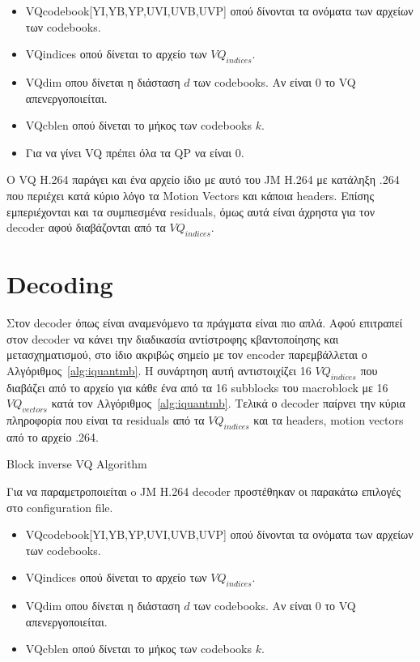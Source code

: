 \begin{itemize}
    \item VQcodebook[YI,YB,YP,UVI,UVB,UVP] οπού δίνονται τα ονόματα των αρχείων των codebooks.
    \item VQindices οπού δίνεται το αρχείο των $VQ_{indices}$.
    \item VQdim οπου δίνεται η διάσταση $d$ των codebooks. Αν είναι 0 το VQ απενεργοποιείται.
    \item VQcblen οπού δίνεται το μήκος των codebooks $k$.
    \item Για να γίνει VQ πρέπει όλα τα QP να είναι 0.
\end{itemize}

\indent Ο VQ H.264 παράγει και ένα αρχείο ίδιο με αυτό του JM H.264 με κατάληξη .264 που περιέχει κατά κύριο λόγο τα Motion Vectors και κάποια headers. Επίσης εμπεριέχονται και τα συμπιεσμένα residuals, όμως  αυτά είναι άχρηστα για τον decoder αφού διαβάζονται από τα $VQ_{indices}$.

\section{Decoding}
\label{section:sect53}

\indent Στον decoder όπως είναι αναμενόμενο τα πράγματα είναι πιο απλά. Αφού επιτραπεί στον decoder να κάνει την διαδικασία αντίστροφης κβαντοποίησης και μετασχηματισμού, στο ίδιο ακριβώς σημείο με τον encoder παρεμβάλλεται ο Αλγόριθμος~\ref{alg:iquantmb}. Η συνάρτηση αυτή αντιστοιχίζει 16 $VQ_{indices}$ που διαβάζει από το αρχείο για κάθε ένα από τα 16 subblocks του macroblock με 16 $VQ_{vectors}$ κατά τον Αλγόριθμος~\ref{alg:iquantmb}. Τελικά ο decoder παίρνει την κύρια πληροφορία που είναι τα residuals από τα $VQ_{indices}$ και τα headers, motion vectors από το αρχείο .264.

\begin{algorithm}[h]
\begin{algorithmic}[1]
\EndFor
\EndFunction
\end{algorithmic}
\caption{Block inverse VQ Algorithm}
\label{alg:iquantmb}
\end{algorithm}

\indent Για να παραμετροποιείται o JM Η.264 decoder προστέθηκαν οι παρακάτω επιλογές στο configuration file.

\begin{itemize}
    \item VQcodebook[YI,YB,YP,UVI,UVB,UVP] οπού δίνονται τα ονόματα των αρχείων των codebooks.
    \item VQindices οπού δίνεται το αρχείο των $VQ_{indices}$.
    \item VQdim οπου δίνεται η διάσταση $d$ των codebooks. Αν είναι 0 το VQ απενεργοποιείται.
    \item VQcblen οπού δίνεται το μήκος των codebooks $k$.
\end{itemize}